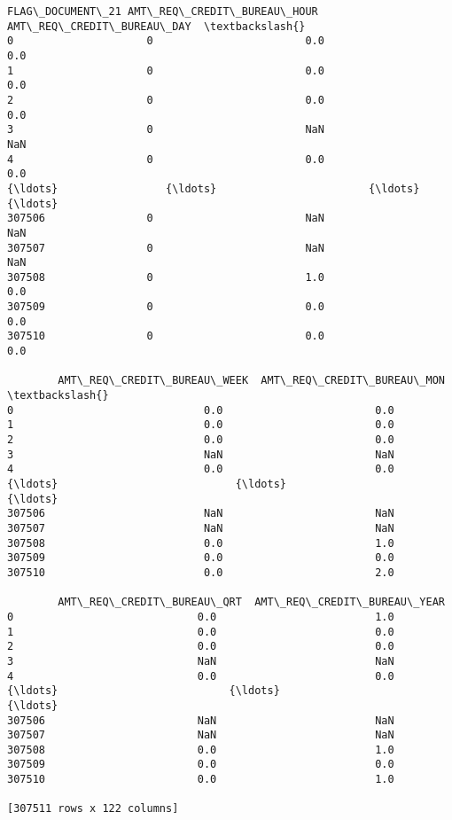 \documentclass[11pt]{article}
\begin{document}
\begin{tcolorbox}[breakable, size=fbox, boxrule=.5pt, pad at break*=1mm, opacityfill=0]
\begin{Verbatim}[commandchars=\\\{\}]
       FLAG\_DOCUMENT\_21 AMT\_REQ\_CREDIT\_BUREAU\_HOUR AMT\_REQ\_CREDIT\_BUREAU\_DAY  \textbackslash{}
0                     0                        0.0                       0.0
1                     0                        0.0                       0.0
2                     0                        0.0                       0.0
3                     0                        NaN                       NaN
4                     0                        0.0                       0.0
{\ldots}                 {\ldots}                        {\ldots}                       {\ldots}
307506                0                        NaN                       NaN
307507                0                        NaN                       NaN
307508                0                        1.0                       0.0
307509                0                        0.0                       0.0
307510                0                        0.0                       0.0

        AMT\_REQ\_CREDIT\_BUREAU\_WEEK  AMT\_REQ\_CREDIT\_BUREAU\_MON  \textbackslash{}
0                              0.0                        0.0
1                              0.0                        0.0
2                              0.0                        0.0
3                              NaN                        NaN
4                              0.0                        0.0
{\ldots}                            {\ldots}                        {\ldots}
307506                         NaN                        NaN
307507                         NaN                        NaN
307508                         0.0                        1.0
307509                         0.0                        0.0
307510                         0.0                        2.0

        AMT\_REQ\_CREDIT\_BUREAU\_QRT  AMT\_REQ\_CREDIT\_BUREAU\_YEAR
0                             0.0                         1.0
1                             0.0                         0.0
2                             0.0                         0.0
3                             NaN                         NaN
4                             0.0                         0.0
{\ldots}                           {\ldots}                         {\ldots}
307506                        NaN                         NaN
307507                        NaN                         NaN
307508                        0.0                         1.0
307509                        0.0                         0.0
307510                        0.0                         1.0

[307511 rows x 122 columns]
\end{Verbatim}
\end{tcolorbox}
        
\end{document}
